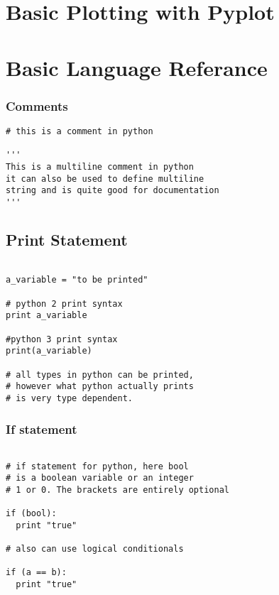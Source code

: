 \documentclass[11pt,a4paper]{article}
\begin{document}
\section{Basic Plotting with Pyplot}

\appendix

\section{Basic Language Referance}

\subsubsection{Comments}
\begin{verbatim}
# this is a comment in python

'''
This is a multiline comment in python
it can also be used to define multiline
string and is quite good for documentation
'''

\end{verbatim}

\subsection{Print Statement}
\begin{verbatim}

a_variable = "to be printed"

# python 2 print syntax
print a_variable

#python 3 print syntax
print(a_variable)

# all types in python can be printed,
# however what python actually prints
# is very type dependent.

\end{verbatim}

\subsubsection{If statement}
\begin{verbatim}

# if statement for python, here bool
# is a boolean variable or an integer
# 1 or 0. The brackets are entirely optional

if (bool):
  print "true"

# also can use logical conditionals

if (a == b):
  print "true"

\end{verbatim}
\end{document}
